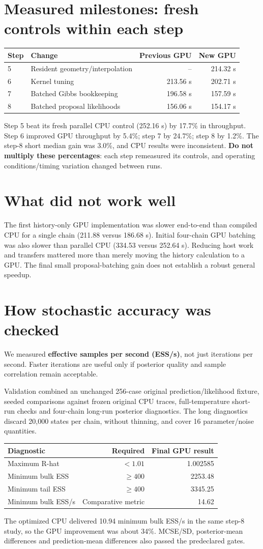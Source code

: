 \documentclass[11pt]{article}
\newcommand{\heading}[1]{\section*{#1}}
\begin{document}
\heading{Measured milestones: fresh controls within each step}
\begin{center}
\begin{tabular}{llrr}
\toprule
Step & Change & Previous GPU & New GPU\\
\midrule
5 & Resident geometry/interpolation & -- & 214.32 s\\
6 & Kernel tuning & 213.56 s & 202.71 s\\
7 & Batched Gibbs bookkeeping & 196.58 s & 157.59 s\\
8 & Batched proposal likelihoods & 156.06 s & 154.17 s\\
\bottomrule
\end{tabular}
\end{center}
Step 5 beat its fresh parallel CPU control (252.16 s) by 17.7\% in throughput.
Step 6 improved GPU throughput by 5.4\%; step 7 by 24.7\%; step 8 by 1.2\%.
The step-8 short median gain was 3.0\%, and CPU results were inconsistent.
\textbf{Do not multiply these percentages}: each step remeasured its controls,
and operating conditions/timing variation changed between runs.

\heading{What did not work well}
The first history-only GPU implementation was slower end-to-end than compiled CPU
for a single chain (211.88 versus 186.68 s). Initial four-chain GPU batching was
also slower than parallel CPU (334.53 versus 252.64 s). Reducing host work and
transfers mattered more than merely moving the history calculation to a GPU.
The final small proposal-batching gain does not establish a robust general speedup.

\newpage
\heading{How stochastic accuracy was checked}
We measured \textbf{effective samples per second (ESS/s)}, not just iterations
per second. Faster iterations are useful only if posterior quality and sample
correlation remain acceptable.

Validation combined an unchanged 256-case original prediction/likelihood fixture,
seeded comparisons against frozen original CPU traces, full-temperature short-run
checks and four-chain long-run posterior diagnostics. The long diagnostics discard
20,000 states per chain, without thinning, and cover 16 parameter/noise quantities.

\begin{center}
\begin{tabular}{lrr}
\toprule
Diagnostic & Required & Final GPU result\\
\midrule
Maximum R-hat & $<1.01$ & 1.002585\\
Minimum bulk ESS & $\geq400$ & 2253.48\\
Minimum tail ESS & $\geq400$ & 3345.25\\
Minimum bulk ESS/s & Comparative metric & 14.62\\
\bottomrule
\end{tabular}
\end{center}
The optimized CPU delivered 10.94 minimum bulk ESS/s in the same step-8 study,
so the GPU improvement was about 34\%. MCSE/SD, posterior-mean differences and
prediction-mean differences also passed the predeclared gates.
\end{document}
